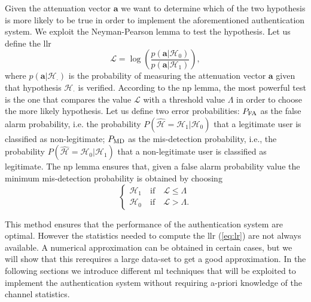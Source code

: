 \documentclass[draftcls,onecolumn,12pt]{IEEEtran}
\begin{document}
Given the attenuation vector $\bm{a}$ we want to determine which of the two hypothesis is more likely to be true in order to implement the aforementioned authentication system. 
We exploit the Neyman-Pearson lemma to test the hypothesis. Let us define the \ac{llr}
\begin{equation}\label{eq:lr}
    \mathcal{L}=\log\left(\frac{p(\bm{a}|\mathcal{H}_0)}{p(\bm{a}|\mathcal{H}_1)}\right),
\end{equation}
where $p(\bm{a}|\mathcal{H}_{\cdot})$ is the probability of measuring the attenuation vector $\bm{a}$ given that hypothesis $\mathcal{H}_\cdot$ is verified. According to the \ac{np} lemma, the most powerful test is the one that compares the value $\mathcal{L}$ with a threshold value $\Lambda$ in order to choose the more likely hypothesis. Let us define two error probabilities: $P_{\rm FA}$ as the false alarm probability, i.e. the probability $P(\hat{\mathcal H} = \mathcal H_1 | \mathcal H_0)$ that a legitimate user is classified as non-legitimate; $P_{\rm MD}$ as the mis-detection probability, i.e., the probability $P(\hat{\mathcal H} = \mathcal H_0 | \mathcal H_1)$ that a non-legitimate user is classified as legitimate. The \ac{np} lemma ensures that, given a false alarm probability value the minimum mis-detection probability is obtained by choosing
\begin{equation}
    \begin{cases}
    \mathcal{H}_1 \quad\text{if} \quad \mathcal{L} \le \Lambda \\
    \mathcal{H}_0  \quad\text{if} \quad \mathcal{L} > \Lambda.
    \end{cases}
\end{equation}

This method ensures that the performance of the authentication system are optimal. However the statistics needed to compute the \ac{llr} (\ref{eq:lr}) are not always available. A numerical approximation can be obtained in certain cases, but we will show  that this rerequires a large data-set to get a good approximation. In the following sections we introduce different \ac{ml} techniques that will be exploited to implement the authentication system without requiring a-priori knowledge of the channel statistics.
\end{document}
